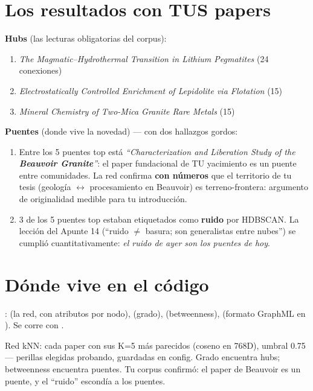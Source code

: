 \documentclass[11pt,a4paper]{article}
\begin{document}
\section{Los resultados con TUS papers}

\textbf{Hubs} (las lecturas obligatorias del corpus):
\begin{enumerate}
  \item \emph{The Magmatic--Hydrothermal Transition in Lithium Pegmatites} (24 conexiones)
  \item \emph{Electrostatically Controlled Enrichment of Lepidolite via Flotation} (15)
  \item \emph{Mineral Chemistry of Two-Mica Granite Rare Metals} (15)
\end{enumerate}

\textbf{Puentes} (donde vive la novedad) — con dos hallazgos gordos:
\begin{enumerate}
  \item Entre los 5 puentes top está \emph{``Characterization and Liberation Study of the
        \textbf{Beauvoir Granite}''}: el paper fundacional de TU yacimiento es un puente
        entre comunidades. La red confirma \textbf{con números} que el territorio de tu
        tesis (geología $\leftrightarrow$ procesamiento en Beauvoir) es terreno-frontera:
        argumento de originalidad medible para tu introducción.
  \item 3 de los 5 puentes top estaban etiquetados como \textbf{ruido} por HDBSCAN. La
        lección del Apunte 14 (``ruido $\neq$ basura; son generalistas entre nubes'') se
        cumplió cuantitativamente: \emph{el ruido de ayer son los puentes de hoy}.
\end{enumerate}

\section{Dónde vive en el código}

:  (la red, con atributos por
nodo),  (grado),  (betweenness),
 (formato GraphML en ).
Se corre con .

\begin{resumen}
Red kNN: cada paper con sus K=5 más parecidos (coseno en 768D), umbral 0.75 — perillas
elegidas probando, guardadas en config. Grado encuentra hubs; betweenness encuentra puentes.
Tu corpus confirmó: el paper de Beauvoir es un puente, y el ``ruido'' escondía a los puentes.
\end{resumen}
\end{document}
